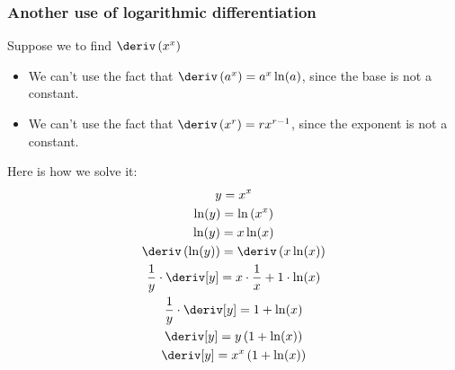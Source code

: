 \subsubsection{Another use of logarithmic differentiation}
Suppose we to find $\deriv\left(x^x\right)$
\begin{itemize}
    \item We can't use the fact that $\deriv\left(a^x\right) = a^x \ln(a)$, since the base is not a constant.
    \item We can't use the fact that $\deriv\left(x^r\right) = rx^{r - 1}$, since the exponent is not a constant.
\end{itemize}
Here is how we solve it:
\begin{gather*}
    y = x^x \\
    \ln(y) = \ln\left(x^x\right) \\
    \ln(y) = x\ln(x) \\
    \deriv\left(\ln(y)\right) = \deriv\left(x\ln(x)\right) \\
    \dfrac{1}{y} \cdot \deriv[y] = x \cdot \dfrac{1}{x} + 1 \cdot \ln(x) \\
    \dfrac{1}{y} \cdot \deriv[y] = 1 + \ln(x) \\
    \deriv[y] = y\left(1 + \ln(x)\right) \\
    \deriv[y] = x^x\left(1 + \ln(x)\right)
\end{gather*}
